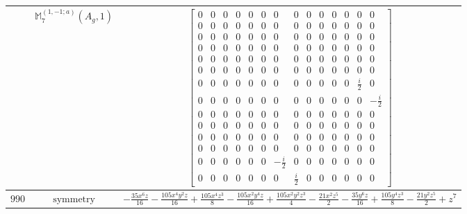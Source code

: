 \documentclass[fleqn,8pt,landscape]{jsarticle}
\begin{document}
\begin{longtable}{ccc}
$  $ & $ \mathbb{M}_{7}^{(1,-1;a)}(A_{g},1) $ & $ \begin{bmatrix} 0 & 0 & 0 & 0 & 0 & 0 & 0 & 0 & 0 & 0 & 0 & 0 & 0 & 0 \\ 0 & 0 & 0 & 0 & 0 & 0 & 0 & 0 & 0 & 0 & 0 & 0 & 0 & 0 \\ 0 & 0 & 0 & 0 & 0 & 0 & 0 & 0 & 0 & 0 & 0 & 0 & 0 & 0 \\ 0 & 0 & 0 & 0 & 0 & 0 & 0 & 0 & 0 & 0 & 0 & 0 & 0 & 0 \\ 0 & 0 & 0 & 0 & 0 & 0 & 0 & 0 & 0 & 0 & 0 & 0 & 0 & 0 \\ 0 & 0 & 0 & 0 & 0 & 0 & 0 & 0 & 0 & 0 & 0 & 0 & 0 & 0 \\ 0 & 0 & 0 & 0 & 0 & 0 & 0 & 0 & 0 & 0 & 0 & 0 & \frac{i}{2} & 0 \\ 0 & 0 & 0 & 0 & 0 & 0 & 0 & 0 & 0 & 0 & 0 & 0 & 0 & - \frac{i}{2} \\ 0 & 0 & 0 & 0 & 0 & 0 & 0 & 0 & 0 & 0 & 0 & 0 & 0 & 0 \\ 0 & 0 & 0 & 0 & 0 & 0 & 0 & 0 & 0 & 0 & 0 & 0 & 0 & 0 \\ 0 & 0 & 0 & 0 & 0 & 0 & 0 & 0 & 0 & 0 & 0 & 0 & 0 & 0 \\ 0 & 0 & 0 & 0 & 0 & 0 & 0 & 0 & 0 & 0 & 0 & 0 & 0 & 0 \\ 0 & 0 & 0 & 0 & 0 & 0 & - \frac{i}{2} & 0 & 0 & 0 & 0 & 0 & 0 & 0 \\ 0 & 0 & 0 & 0 & 0 & 0 & 0 & \frac{i}{2} & 0 & 0 & 0 & 0 & 0 & 0 \end{bmatrix} $ \\ \hline
$ 990 $ & $ \text{symmetry} $ & $ - \frac{35 x^{6} z}{16} - \frac{105 x^{4} y^{2} z}{16} + \frac{105 x^{4} z^{3}}{8} - \frac{105 x^{2} y^{4} z}{16} + \frac{105 x^{2} y^{2} z^{3}}{4} - \frac{21 x^{2} z^{5}}{2} - \frac{35 y^{6} z}{16} + \frac{105 y^{4} z^{3}}{8} - \frac{21 y^{2} z^{5}}{2} + z^{7} $ \\

\end{longtable}
\end{document}
